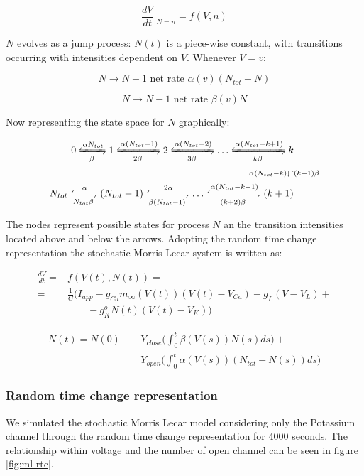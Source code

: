 	$$\frac{dV}{dt}\biggr\vert_{N=n} = f(V, n)$$

	$N$ evolves as a jump process: $N(t)$ is a piece-wise constant, with transitions occurring with intensities dependent on $V$.
	Whenever $V = v$:

	$$N\rightarrow N + 1\text{ net rate } \alpha(v)(N_{tot}-N)$$

	$$N\rightarrow N - 1\text{ net rate } \beta(v)N$$

	Now representing the state space for $N$ graphically:

	\begin{align*}
		0\xleftrightharpoons[\beta]{\alpha N_{tot}} 1 \xleftrightharpoons[2\beta]{\alpha(N_{tot}-1)}2\xleftrightharpoons[3\beta]{\alpha(N_{tot}-2)} \dots \xleftrightharpoons[k\beta]{\alpha(N_{tot}-k+1)}k&\\
		\scriptstyle{\alpha(N_{tot}-k)}\downharpoonleft\upharpoonright&\scriptstyle{(k+1)\beta}\\
		N_{tot}\xleftrightharpoons[N_{tot}\beta]{\alpha}(N_{tot}-1)\xleftrightharpoons[\beta(N_{tot}-1)]{2\alpha}\dots\xleftrightharpoons[(k+2)\beta]{\alpha(N_{tot}-k-1)}(k+1)&
	\end{align*}

The nodes represent possible states for process $N$ an the transition intensities located above and below the arrows.
Adopting the random time change representation the stochastic Morris-Lecar system is written as:

\begin{align*}
	\frac{dV}{dt} =& f(V(t), N(t)) = \\
								=& \frac{1}{C}(I_{app}-g_{Ca}m_\infty(V(t))(V(t)-V_{Ca})-g_L(V-V_L) +\\
								 &\qquad - g_K^oN(t)(V(t)-V_K))
\end{align*}

\begin{align*}
	N(t) = N(0) -&Y_{close}\biggl(\int_0^t\beta(V(s))N(s)ds\biggr) + \\
							 &Y_{open}\biggl(\int_0^t\alpha(V(s))(N_{tot}-N(s))ds\biggr)
\end{align*}

		\subsubsection{Random time change representation}
		We simulated the stochastic Morris Lecar model considering only the Potassium channel through the random time change representation for $4000$ seconds.
		The relationship within voltage and the number of open channel can be seen in figure \ref{fig:ml-rtc}.

